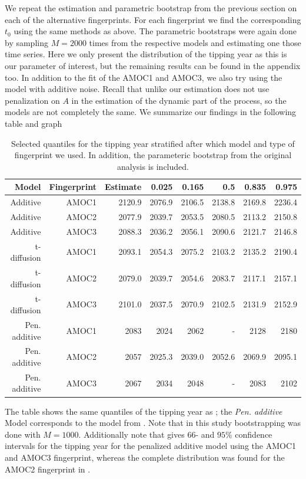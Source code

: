 We repeat the estimation and parametric bootstrap from the previous section on each of the alternative fingerprints. For each fingerprint we find the corresponding $t_0$ using the same methods as above. The parametric bootstraps were again done by sampling $M = 2000$ times from the respective models and estimating one those time series. Here we only present the distribution of the tipping year as this is our parameter of interest, but the remaining results can be found in the appendix too. In addition to the fit of the AMOC1 and AMOC3, we also try using the model with additive noise. Recall that unlike \cite{Ditlevsen2023} our estimation does not use penalization on $A$ in the estimation of the dynamic part of the process, so the models are not completely the same. We summarize our findings in the following table and graph
\begin{table}[ht]
    \centering
    \begin{tabular}{rrrrrrrr}
    Model & Fingerprint & Estimate    & 0.025  & 0.165  & 0.5    & 0.835  & 0.975 \\ 
      \hline
    Additive & AMOC1 & 2120.9         & 2076.9 & 2106.5 & 2138.8 & 2169.8 & 2236.4 \\
    Additive & AMOC2 & 2077.9         & 2039.7 & 2053.5 & 2080.5 & 2113.2 & 2150.8 \\ 
    Additive & AMOC3 & 2088.3         & 2036.2 & 2056.1 & 2090.6 & 2121.7 & 2146.8 \\ 
    t-diffusion & AMOC1 & 2093.1      & 2054.3 & 2075.2 & 2103.2 & 2135.2 & 2190.4 \\ 
    t-diffusion & AMOC2 & 2079.0      & 2039.7 & 2054.6 & 2083.7 & 2117.1 & 2157.1 \\ 
    t-diffusion & AMOC3 & 2101.0      & 2037.5 & 2070.9 & 2102.5 & 2131.9 & 2152.9 \\ 
    Pen. additive& AMOC1 & 2083       & 2024 & 2062 & - & 2128 & 2180 \\
    Pen. additive& AMOC2 & 2057       & 2025.3 & 2039.0 & 2052.6 & 2069.9 & 2095.1 \\ 
    Pen. additive& AMOC3 & 2067       & 2034 & 2048 & - & 2083 & 2102 \\
       \hline
    \end{tabular}
    \caption{Selected quantiles for the tipping year stratified after which model and type of fingerprint we used. In addition, the parameteric bootstrap from the original analysis \cite{Ditlevsen2023} is included.}
    \label{table:tipping_quantiles}
\end{table}
The table shows the same quantiles of the tipping year as \cite{DitlevsenSupplementary}; the \textit{Pen. additive} Model corresponds to the model from \cite{Ditlevsen2023}. Note that in this study bootstrapping was done with $M = 1000$. Additionally note that \cite[table 1]{Ditlevsen2023} gives $66$- and $95\%$ confidence intervals for the tipping year for the penalized additive model using the AMOC1 and AMOC3 fingerprint, whereas the complete distribution was found for the AMOC2 fingerprint in \cite{DitlevsenSupplementary}.

